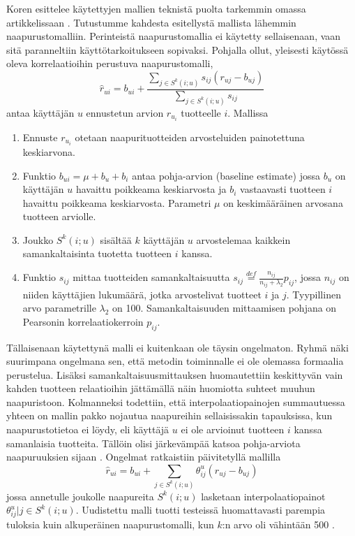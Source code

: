 \documentclass[12pt,finnish]{tktltiki2}
\theoremstyle{definition}
\theoremstyle{remark}
\begin{document}
	Koren esittelee käytettyjen mallien teknistä puolta tarkemmin omassa artikkelissaan \cite{Koren:2008:FMN:1401890.1401944}. Tutustumme kahdesta esitellystä mallista lähemmin naapurustomalliin. Perinteistä naapurustomallia ei käytetty sellaisenaan, vaan sitä paranneltiin käyttötarkoitukseen sopivaksi. Pohjalla ollut, yleisesti käytössä oleva korrelaatioihin perustuva naapurustomalli,
\begin{displaymath}
\hat{r}_{ui} = b_{ui} + \frac{\sum_{j\in S^{k}(i;u)} s_{ij}(r_{uj}-b_{uj})}{\sum_{j \in S^{k} (i;u)}s_{ij} }
\end{displaymath}         
antaa käyttäjän $u$ ennustetun arvion $r_{u_{i}}$ tuotteelle $i$. Mallissa
\begin{enumerate}
\item Ennuste $r_{u_{i}}$ otetaan naapurituotteiden arvosteluiden painotettuna keskiarvona.
\item Funktio $b_{ui} = \mu + b_u + b_i$ antaa pohja-arvion (baseline estimate) jossa $b_u$ on käyttäjän $u$ havaittu poikkeama keskiarvosta ja $b_i$ vastaavasti tuotteen $i$ havaittu poikkeama keskiarvosta. Parametri $\mu$ on keskimääräinen arvosana tuotteen arviolle.
\item Joukko $S^k (i;u)$ sisältää $k$ käyttäjän $u$ arvostelemaa kaikkein samankaltaisinta tuotetta tuotteen $i$ kanssa.
\item Funktio $s_{ij}$ mittaa tuotteiden samankaltaisuutta $s_{ij} \stackrel{def}{=} \frac{n_{ij}}{n_{ij} + \lambda_2} p_{ij}$, jossa $n_{ij}$ on niiden käyttäjien lukumäärä, jotka arvostelivat tuotteet $i$ ja $j$. Tyypillinen arvo parametrille $\lambda_2$ on 100. Samankaltaisuuden mittaamisen pohjana on Pearsonin korrelaatiokerroin $p_{ij}$.
\end{enumerate} 

Tällaisenaan käytettynä malli ei kuitenkaan ole täysin ongelmaton. Ryhmä näki suurimpana ongelmana sen, että metodin toiminnalle ei ole olemassa formaalia perustelua. Lisäksi samankaltaisuusmittauksen huomautettiin keskittyvän vain kahden tuotteen relaatioihin jättämällä näin huomiotta suhteet muuhun naapuristoon. Kolmanneksi todettiin, että interpolaatiopainojen summautuessa yhteen on mallin pakko nojautua naapureihin sellaisissakin tapauksissa, kun naapurustotietoa ei löydy, eli käyttäjä $u$ ei ole arvioinut tuotteen $i$ kanssa samanlaisia tuotteita. Tällöin olisi järkevämpää katsoa pohja-arviota naapuruuksien sijaan \cite{Koren:2008:FMN:1401890.1401944}.
Ongelmat ratkaistiin päivitetyllä mallilla
\begin{displaymath}
\hat{r}_{ui} = b_{ui} + \sum_{j\in{S^{k}} (i;u)}\theta^{u}_{ij}(r_{uj}-b_{uj})
\end{displaymath}
jossa annetulle joukolle naapureita $S^{k}(i;u)$ lasketaan interpolaatiopainot $\theta^{u}_{ij}|j \in S^{k}(i;u)$. Uudistettu malli tuotti testeissä huomattavasti parempia tuloksia kuin alkuperäinen naapurustomalli, kun $k$:n arvo oli vähintään 500 \cite{Koren:2008:FMN:1401890.1401944}.
        
\end{document}
